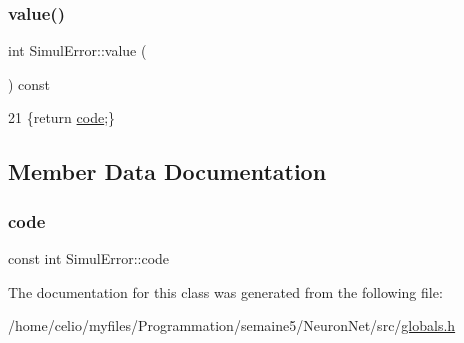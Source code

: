 \subsubsection{\texorpdfstring{value()}{value()}}
{\footnotesize\ttfamily int Simul\+Error\+::value (\begin{DoxyParamCaption}{ }\end{DoxyParamCaption}) const\hspace{0.3cm}{\ttfamily [inline]}}


\begin{DoxyCode}
21 \{\textcolor{keywordflow}{return} \hyperlink{classSimulError_a5cd98a7eddc7982f5c715ef1c76a1bc2}{code};\}
\end{DoxyCode}


\subsection{Member Data Documentation}
\mbox{\label{classSimulError_a5cd98a7eddc7982f5c715ef1c76a1bc2}} 
\subsubsection{\texorpdfstring{code}{code}}
{\footnotesize\ttfamily const int Simul\+Error\+::code\hspace{0.3cm}{\ttfamily [protected]}}



The documentation for this class was generated from the following file\+:\begin{DoxyCompactItemize}
\item 
/home/celio/myfiles/\+Programmation/semaine5/\+Neuron\+Net/src/\hyperlink{globals_8h}{globals.\+h}\end{DoxyCompactItemize}
